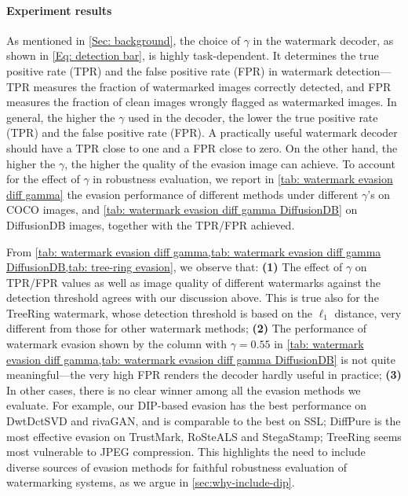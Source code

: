 \paragraph{Experiment results} 
As mentioned in \cref{Sec: background}, the choice of $\gamma$ in the watermark decoder, as shown in \cref{Eq: detection bar}, is highly task-dependent. It determines the true positive rate (TPR) and the false positive rate (FPR) in watermark detection---TPR measures the fraction of watermarked images correctly detected, and FPR measures the fraction of clean images wrongly flagged as watermarked images. In general, the higher the $\gamma$ used in the decoder, the lower the true positive rate (TPR) and the false positive rate (FPR). A practically useful watermark decoder should have a TPR close to one and a FPR close to zero. On the other hand, the higher the $\gamma$, the higher the quality of the evasion image can achieve. To account for the effect of $\gamma$ in robustness evaluation, we report in \cref{tab: watermark evasion diff gamma} the evasion performance of different methods under different $\gamma$'s on COCO images, and \cref{tab: watermark evasion diff gamma DiffusionDB} on DiffusionDB images, together with the TPR/FPR achieved. %

From \cref{tab: watermark evasion diff gamma,tab: watermark evasion diff gamma DiffusionDB,tab: tree-ring evasion}, we observe that: \textbf{(1)} The effect of $\gamma$ on TPR/FPR values as well as image quality of different watermarks against the detection threshold agrees with our discussion above. This is true also for the TreeRing watermark, whose detection threshold is based on the $\ell_1$ distance, very different from those for other watermark methods; \textbf{(2)} The performance of watermark evasion shown by the column with $\gamma = 0.55$ in \cref{tab: watermark evasion diff gamma,tab: watermark evasion diff gamma DiffusionDB} is not quite meaningful---the very high FPR renders the decoder hardly useful in practice; \textbf{(3)} In other cases, there is no clear winner among all the evasion methods we evaluate. For example, our DIP-based evasion has the best performance on DwtDctSVD and rivaGAN, and is comparable to the best on SSL; DiffPure is the most effective evasion on TrustMark, RoSteALS and StegaStamp; TreeRing seems most vulnerable to JPEG compression. This highlights the need to include diverse sources of evasion methods for faithful robustness evaluation of watermarking systems, as we argue in \cref{sec:why-include-dip}. 

